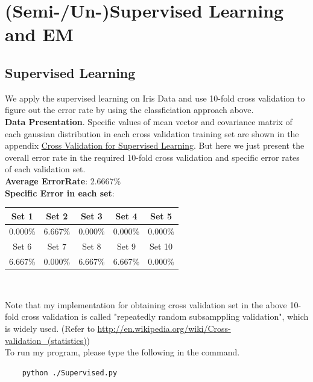 \documentclass[11pt,a4paper]{article}
\newcommand{\htab}{\hspace*{0.63cm}}
\begin{document}
\section{(Semi-/Un-)Supervised Learning and EM}
\subsection{Supervised Learning}
\htab We apply the supervised learning on Iris Data and use 10-fold cross validation to figure out
the error rate by using the classficiation approach above. \\
\htab \textbf{Data Presentation}. Specific values of mean vector and covariance matrix 
of each gaussian distribution in each cross validation training set are shown in the 
appendix \hyperlink{cv}{Cross Validation for Supervised Learning}. But here we just 
present the overall error rate in the required 10-fold cross validation 
and specific error rates of each validation set. \\
\htab \textbf{Average ErrorRate}: 2.6667\%  \\
\htab \textbf{Specific Error in each set}: 
\begin{center}
    \begin{tabular}{||c|c|c|c|c||} \hline
        Set 1 &  Set 2  & Set 3  & Set 4  &  Set 5  \\ \hline
        0.000\% &  6.667\% &  0.000\% &  0.000\% &  0.000\% \\ \hline
        Set 6  &  Set 7  &  Set 8  &  Set 9  &  Set 10  \\ \hline
        6.667\% &  0.000\% &  6.667\% &  6.667\% &  0.000\% \\ \hline
    \end{tabular} \\
\end{center}
\htab Note that my implementation for obtaining cross validation set in the above 10-fold 
cross validation is called "repeatedly random subsamppling validation", which is widely used.
(Refer to \url{http://en.wikipedia.org/wiki/Cross-validation\_(statistics)}) \\
\htab To run my program, please type the following in the command. 
\begin{verbatim}
    python ./Supervised.py
\end{verbatim}
\end{document}
